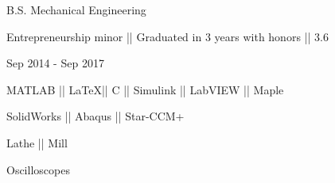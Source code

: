 \vspace{1ex}

{{\small B.S. Mechanical Engineering}}
\begin{detail}
\BulletItem
Entrepreneurship minor || Graduated in 3 years with honors || 3.6
\end{detail}

\begin{subtitle}
\vspace{-8ex}
{{Sep 2014 - Sep 2017}}
\end{subtitle}
\vspace{1ex}

\vspace{-1ex}


\vspace{-1.5ex}
{
\vspace{1.8ex}
\color{cyan}\small
{MATLAB || \LaTeX || C || Simulink || LabVIEW || Maple} %
}

{
\vspace{-2.5ex}\hspace{3.17in}
\color{cyan}\small
{SolidWorks || Abaqus || Star-CCM+} %
}

{
\vspace{-0.5ex}
\color{cyan}\small
{Lathe || Mill} %
}

{
\vspace{-2.5ex}\hspace{3.17in}
\color{cyan}\small
{Oscilloscopes} %
}

